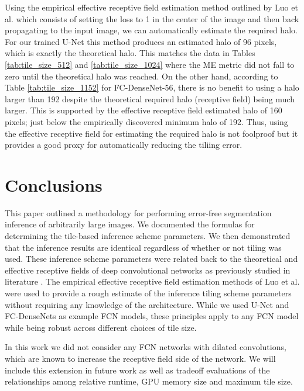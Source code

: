 \documentclass[runningheads]{llncs}
\begin{document}
Using the empirical effective receptive field estimation method outlined by Luo et al. \cite{Luo2016} which consists of setting the loss to 1 in the center of the image and then back propagating to the input image, we can automatically estimate the required halo. For our trained U-Net \cite{Ronneberger2015a} this method produces an estimated halo of 96 pixels, which is exactly the theoretical halo. This matches the data in Tables \ref{tab:tile_size_512} and \ref{tab:tile_size_1024} where the ME metric did not fall to zero until the theoretical halo was reached. On the other hand, according to Table \ref{tab:tile_size_1152} for FC-DenseNet-56, there is no benefit to using a halo larger than 192 despite the theoretical required halo (receptive field) being much larger. This is supported by the effective receptive field estimated halo of 160 pixels; just below the empirically discovered minimum halo of 192. Thus, using the effective receptive field for estimating the required halo is not foolproof but it provides a good proxy for automatically reducing the tiliing error. 


\section{Conclusions}
\label{conclusion}

This paper outlined a methodology for performing error-free segmentation inference of arbitrarily large images. 
We documented the formulas for determining the tile-based inference scheme parameters. We then demonstrated that the inference results are identical regardless of whether or not tiling was used. These inference scheme parameters were related back to the theoretical and effective receptive fields of deep convolutional networks as previously studied in literature \cite{Luo2016}. The empirical effective receptive field estimation methods of Luo et al. \cite{Luo2016} were used to provide a rough estimate of the inference tiling scheme parameters without requiring any knowledge of the architecture.
While we used U-Net and FC-DenseNets as example FCN models, these principles apply to any FCN model while being robust across different choices of tile size. 

In this work we did not consider any FCN networks with dilated convolutions, which are known to increase the receptive field side of the network. We will include this extension in future work as well as tradeoff evaluations of the relationships among relative runtime, GPU memory size and maximum tile size.
\end{document}
